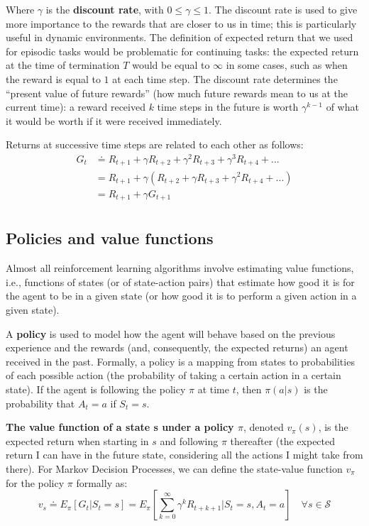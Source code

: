 Where $\gamma$ is the \textbf{discount rate}, with $0 \le \gamma \le 1$. The discount rate is used to give more importance to the rewards that are closer to us in time; this is particularly useful in dynamic environments. The definition of expected return that we used for episodic tasks would be problematic for continuing tasks: the expected return at the time of termination $T$ would be equal to $\infty$ in some cases, such as when the reward is equal to $1$ at each time step. The discount rate determines the ``present value of future rewards'' (how much future rewards mean to us at the current time): a reward received $k$ time steps in the future is worth $\gamma^{k-1}$ of what it would be worth if it were received immediately.

Returns at successive time steps are related to each other as follows:
\begin{equation*}
    \begin{split}
        G_t & \doteq R_{t+1} + \gamma R_{t+2} + \gamma^2 R_{t+3} + \gamma^3 R_{t+4} + ... \\
        & = R_{t+1} + \gamma \left( R_{t+2} + \gamma R_{t+3} + \gamma^2 R_{t+4} + ... \right) \\
        & = R_{t+1} + \gamma G_{t+1} \\
    \end{split}
\end{equation*}

\subsection{Policies and value functions}
Almost all reinforcement learning algorithms involve estimating value functions, i.e., functions of states (or of state-action pairs) that estimate how good it is for the agent to be in a given state (or how good it is to perform a given action in a given state).

A \textbf{policy} is used to model how the agent will behave based on the previous experience and the rewards (and, consequently, the expected returns) an agent received in the past. Formally, a policy is a mapping from states to probabilities of each possible action (the probability of taking a certain action in a certain state). If the agent is following the policy $\pi$ at time $t$, then $\pi (a \vert s)$ is the probability that $A_t=a$ if $S_t=s$.

\textbf{The value function of a state s under a policy $\pi$}, denoted $v_\pi (s)$, is the expected return when starting in $s$ and following $\pi$ thereafter (the expected return I can have in the future state, considering all the actions I might take from there). For Markov Decision Processes, we can define the state-value function $v_\pi$ for the policy $\pi$ formally as:
\begin{equation}
    v_s \doteq E_\pi \left[ G_t \vert S_t = s \right] = E_\pi \left[ \sum_{k=0}^{\infty}  \gamma^k R_{t+k+1} \vert S_t = s, A_t = a \right] \quad \forall s \in \mathcal{S}
\end{equation}

